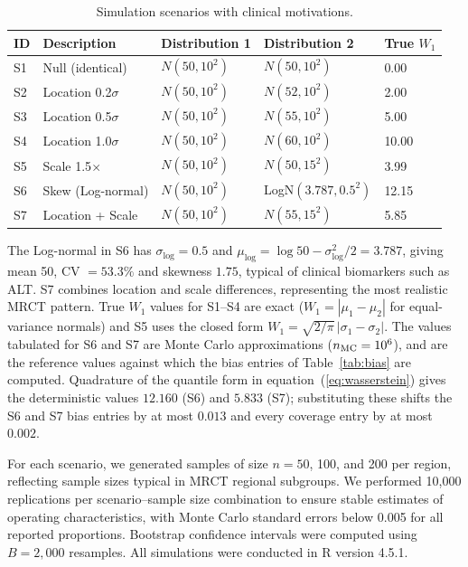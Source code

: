 \documentclass[AMA,Times1COL]{WileyNJDv5}
\begin{document}
\begin{table}[ht]
\centering
\caption{Simulation scenarios with clinical motivations.\label{tab:scenarios}}
\begin{tabular}{lllll}
\toprule
\textbf{ID} & \textbf{Description} & \textbf{Distribution 1} & \textbf{Distribution 2} & \textbf{True $W_1$} \\
\midrule
S1 & Null (identical) & $N(50, 10^2)$ & $N(50, 10^2)$ & 0.00 \\
S2 & Location 0.2$\sigma$ & $N(50, 10^2)$ & $N(52, 10^2)$ & 2.00 \\
S3 & Location 0.5$\sigma$ & $N(50, 10^2)$ & $N(55, 10^2)$ & 5.00 \\
S4 & Location 1.0$\sigma$ & $N(50, 10^2)$ & $N(60, 10^2)$ & 10.00 \\
S5 & Scale 1.5$\times$ & $N(50, 10^2)$ & $N(50, 15^2)$ & 3.99 \\
S6 & Skew (Log-normal) & $N(50, 10^2)$ & LogN$(3.787, 0.5^2)$ & 12.15 \\
S7 & Location + Scale & $N(50, 10^2)$ & $N(55, 15^2)$ & 5.85 \\
\bottomrule
\end{tabular}
\begin{tablenotes}
\item The Log-normal in S6 has $\sigma_{\log} = 0.5$ and $\mu_{\log} = \log 50 - \sigma_{\log}^2/2 = 3.787$, giving mean 50, CV $= 53.3\%$ and skewness $1.75$, typical of clinical biomarkers such as ALT. S7 combines location and scale differences, representing the most realistic MRCT pattern. True $W_1$ values for S1--S4 are exact ($W_1 = |\mu_1 - \mu_2|$ for equal-variance normals) and S5 uses the closed form $W_1 = \sqrt{2/\pi}\,|\sigma_1 - \sigma_2|$. The values tabulated for S6 and S7 are Monte Carlo approximations ($n_{\textup{MC}} = 10^6$), and are the reference values against which the bias entries of Table~\ref{tab:bias} are computed. Quadrature of the quantile form in equation~(\ref{eq:wasserstein}) gives the deterministic values $12.160$ (S6) and $5.833$ (S7); substituting these shifts the S6 and S7 bias entries by at most $0.013$ and every coverage entry by at most $0.002$.
\end{tablenotes}
\end{table}

For each scenario, we generated samples of size $n = 50$, 100, and 200 per region, reflecting sample sizes typical in MRCT regional subgroups. We performed 10{,}000 replications per scenario--sample size combination to ensure stable estimates of operating characteristics, with Monte Carlo standard errors below 0.005 for all reported proportions. Bootstrap confidence intervals were computed using $B = 2{,}000$ resamples. All simulations were conducted in R version 4.5.1.
\end{document}
